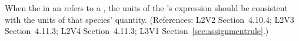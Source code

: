 When the  in an \InitialAssignment refers to a \Species,
the units of the \InitialAssignment's  expression should be
consistent with the units of that species' quantity.  (References:
L2V2 Section~4.10.4; L2V3 Section~4.11.3; L2V4 Section~4.11.3; 
L3V1 Section~\ref{sec:assignmentrule}.)
